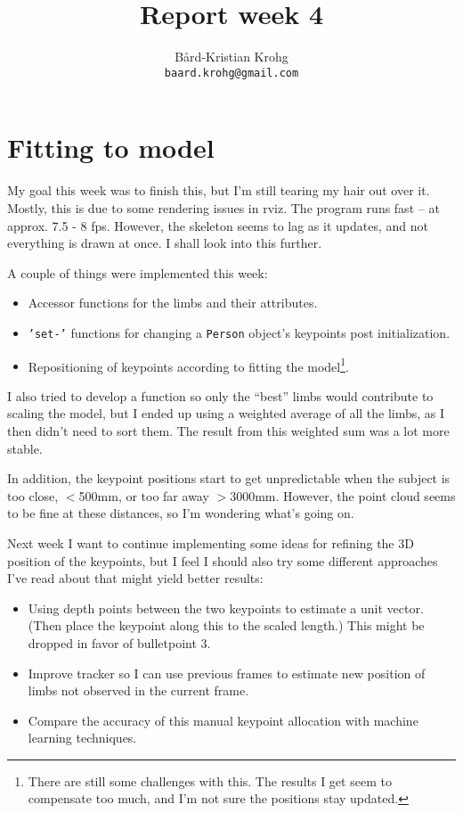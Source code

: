 \documentclass[a4paper]{article}
\title{Report week 4}
\author{Bård-Kristian Krohg \\ \texttt{baard.krohg@gmail.com}}
\begin{document}
\maketitle

\section{Fitting to model}
My goal this week was to finish this, but I'm still tearing my hair out over it. Mostly, this is due to some rendering issues in rviz. The program runs fast -- at approx. 7.5 - 8 fps. However, the skeleton seems to lag as it updates, and not everything is drawn at once. I shall look into this further.

A couple of things were implemented this week:
\begin{itemize}
\item Accessor functions for the limbs and their attributes.
\item \texttt{'set-'} functions for changing a \texttt{Person} object's keypoints post initialization.
\item Repositioning of keypoints according to fitting the model\footnote{There are still some challenges with this. The results I get seem to compensate too much, and I'm not sure the positions stay updated.}.
\end{itemize}

I also tried to develop a function so only the ``best'' limbs would contribute to scaling the model, but I ended up using a weighted average of all the limbs, as I then didn't need to sort them. The result from this weighted sum was a lot more stable.

In addition, the keypoint positions start to get unpredictable when the subject is too close, $<$500mm, or too far away $>$3000mm. However, the point cloud seems to be fine at these distances, so I'm wondering what's going on.

Next week I want to continue implementing some ideas for refining the 3D position of the keypoints, but I feel I should also try some different approaches I've read about that might yield better results:
\begin{itemize}
\item Using depth points between the two keypoints to estimate a unit vector. (Then place the keypoint along this to the scaled length.) This might be dropped in favor of bulletpoint 3.
\item Improve tracker so I can use previous frames to estimate new position of limbs not observed in the current frame.
\item Compare the accuracy of this manual keypoint allocation with machine learning techniques.
\end{itemize}
\end{document}
